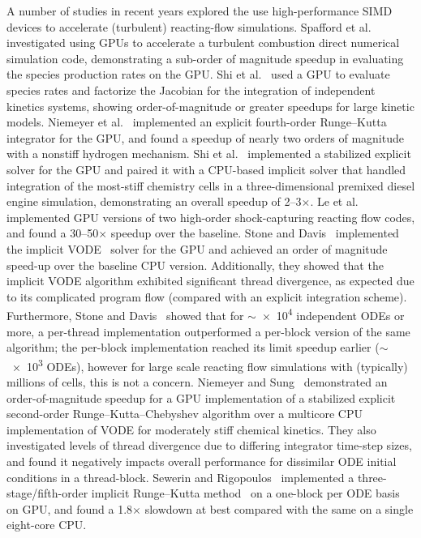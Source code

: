 \documentclass[final,twocolumn]{elsarticle}
\begin{document}
A number of studies in recent years explored the use high-performance SIMD devices to accelerate (turbulent) reacting-flow simulations.
Spafford et al.~\cite{Spafford:2010aa} investigated using GPUs to accelerate a turbulent combustion direct numerical simulation code, demonstrating a sub-order of magnitude speedup in evaluating the species production rates on the GPU.
Shi et al.~\cite{Shi:2011aa} used a GPU to evaluate species rates and factorize the Jacobian for the integration of independent kinetics systems, showing order-of-magnitude or greater speedups for large kinetic models.
Niemeyer et al.~\cite{Niemeyer:2011aa} implemented an explicit fourth-order Runge--Kutta integrator for the GPU, and found a speedup of nearly two orders of magnitude with a nonstiff hydrogen mechanism.
Shi et al.~\cite{Shi:2012aa} implemented a stabilized explicit solver for the GPU and paired it with a CPU-based implicit solver that handled integration of the most-stiff chemistry cells in a three-dimensional premixed diesel engine simulation, demonstrating an overall speedup of \numrange{2}{3}$\times$.
Le et al.~\cite{Le2013596} implemented GPU versions of two high-order shock-capturing reacting flow codes, and found a \numrange{30}{50}$\times$ speedup over the baseline.
Stone and Davis~\cite{Stone:2013aa} implemented the implicit VODE~\cite{Brown:1989vl} solver for the GPU and achieved an order of magnitude speed-up over the baseline CPU version.
Additionally, they showed that the implicit VODE algorithm exhibited significant thread divergence, as expected due to its complicated program flow (compared with an explicit integration scheme).
Furthermore, Stone and Davis~\cite{Stone:2013aa} showed that for $\sim$\num{e4} independent ODEs or more, a per-thread implementation outperformed a per-block version of the same algorithm; the per-block implementation reached its limit speedup earlier ($\sim$\num{e3} ODEs), however for large scale reacting flow simulations with (typically) millions of cells, this is not a concern.
Niemeyer and Sung~\cite{Niemeyer:2014aa} demonstrated an order-of-magnitude speedup for a GPU implementation of a stabilized explicit second-order Runge--Kutta--Chebyshev algorithm over a multicore CPU implementation of VODE for moderately stiff chemical kinetics.
They also investigated levels of thread divergence due to differing integrator time-step sizes, and found it negatively impacts overall performance for dissimilar ODE initial conditions in a thread-block.
Sewerin and Rigopoulos~\cite{Sewerin20151375} implemented a three-stage\slash fifth-order implicit Runge--Kutta method~\cite{wanner1991solving} on a one-block per ODE basis on GPU, and found a \num{1.8}$\times$ slowdown at best compared with the same on a single eight-core CPU.
\end{document}
